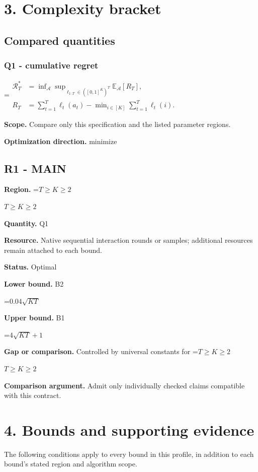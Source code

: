 \documentclass[10pt,a4paper]{article}
\newcommand{\AtlasMath}[1]{\par\begingroup\centering\setbox0=\hbox{$\displaystyle #1$}\ifdim\wd0>1.4\linewidth\typeout{ATLAS WIDE FORMULA: \the\wd0}\fi\ifdim\wd0>\linewidth\resizebox{\linewidth}{!}{\box0}\else\box0\fi\par\endgroup}
\newcommand{\AtlasInlineMath}[1]{\begingroup\setbox0=\hbox{$#1$}\ifdim\wd0>.4\linewidth\endgroup\AtlasMath{#1}\else\endgroup$#1$\fi}
\begin{document}
\section{3. Complexity bracket}
\subsection{Compared quantities}
\subsubsection{Q1 - cumulative regret}
\AtlasMath{\begin{aligned}\mathcal R_T^*&=\inf_{\mathcal A}\sup_{\ell_{1:T}\in([0,1]^K)^T}\mathbb E_{\mathcal A}[R_T],\\ R_T&=\sum_{t=1}^T\ell_t(a_t)-\min_{i\in[K]}\sum_{t=1}^T\ell_t(i).\end{aligned}}
\textbf{Scope.} Compare only this specification and the listed parameter regions.

\textbf{Optimization direction.} minimize

\subsection{R1 - MAIN}
\textbf{Region.} \AtlasInlineMath{T\ge K\ge 2}

\textbf{Quantity.} Q1

\textbf{Resource.} Native sequential interaction rounds or samples; additional resources remain attached to each bound.

\textbf{Status.} Optimal

\textbf{Lower bound.} B2

\AtlasMath{0.04\sqrt{KT}}
\textbf{Upper bound.} B1

\AtlasMath{4\sqrt{KT}+1}
\textbf{Gap or comparison.} Controlled by universal constants for \AtlasInlineMath{T\ge K\ge2}

\textbf{Comparison argument.} Admit only individually checked claims compatible with this contract.

\section{4. Bounds and supporting evidence}
The following conditions apply to every bound in this profile, in addition to each bound's stated region and algorithm scope.
\end{document}
